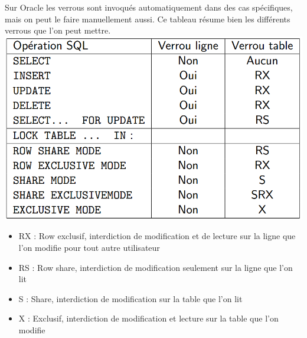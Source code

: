 \documentclass{report}
\begin{document}
Sur Oracle les verrous sont invoqués automatiquement dans des cas spécifiques, mais on peut le faire manuellement aussi. Ce tableau résume bien les différents verrous que l'on peut mettre.
\newline
\includegraphics[scale=0.45]{./Pictures/BD4.png}
\newline
\begin{itemize}
\item RX : Row exclusif, interdiction de modification et de lecture sur la ligne que l'on modifie pour tout autre utilisateur
\item RS : Row share, interdiction de modification seulement sur la ligne que l'on lit
\item S : Share, interdiction de modification sur la table que l'on lit
\item X : Exclusif, interdiction de modification et lecture sur la table que l'on modifie
\end{itemize}
\end{document}
